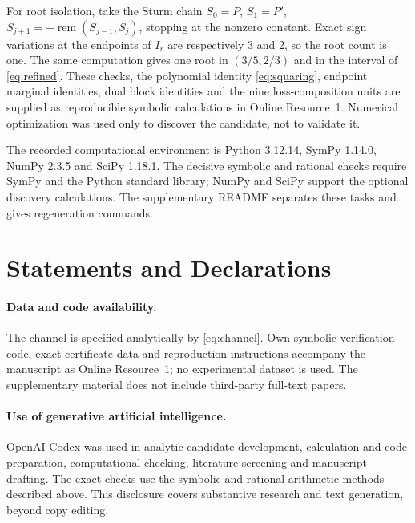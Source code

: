 \documentclass[11pt]{article}
\begin{document}
For root isolation, take the Sturm chain $S_0=P$, $S_1=P'$,
$S_{j+1}=-\operatorname{rem}(S_{j-1},S_j)$, stopping at the nonzero
constant. Exact sign variations at the endpoints of $I_r$ are respectively
3 and 2, so the root count is one. The same computation gives one root
in $(3/5,2/3)$ and in the interval of \eqref{eq:refined}. These checks,
the polynomial identity \eqref{eq:squaring}, endpoint marginal identities,
dual block identities and the nine loss-composition units are supplied as
reproducible symbolic calculations in Online Resource~1. Numerical
optimization was used only to discover the candidate, not to validate it.

The recorded computational environment is Python 3.12.14, SymPy 1.14.0,
NumPy 2.3.5 and SciPy 1.18.1. The decisive symbolic and rational checks
require SymPy and the Python standard library; NumPy and SciPy support
the optional discovery calculations. The supplementary README separates
these tasks and gives regeneration commands.

\section*{Statements and Declarations}
\paragraph{Data and code availability.}
The channel is specified analytically by \eqref{eq:channel}.
Own symbolic verification code, exact certificate data and reproduction
instructions accompany the manuscript as Online Resource~1; no experimental
dataset is used. The supplementary material does not include third-party
full-text papers.
\paragraph{Use of generative artificial intelligence.}
OpenAI Codex was used in analytic candidate development, calculation and
code preparation, computational checking, literature screening and manuscript
drafting. The exact checks use the symbolic and rational arithmetic methods
described above. This disclosure covers substantive research and text
generation, beyond copy editing.



\end{document}
